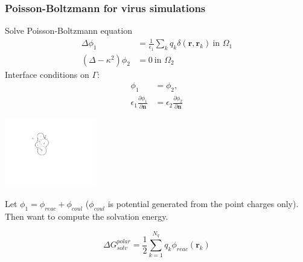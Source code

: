 \documentclass[dvipsnames,10pt]{beamer}
\begin{document}
\begin{frame}
	\frametitle{Poisson-Boltzmann for virus simulations}
	
	\vspace{.3cm}
	
	\begin{minipage}{5cm}
		Solve Poisson-Boltzmann equation
		\begin{align}
			\Delta\phi_1 &= \frac{1}{\epsilon_1}\sum_{k}q_k\delta(\mathbf{r}, \mathbf{r}_k)~\text{in }\Omega_1\nonumber\\
			(\Delta - \kappa^2)\phi_2 &= 0~\text{in }\Omega_2\nonumber
		\end{align}
		Interface conditions on $\Gamma$:
		\begin{align}
			\phi_1 &= \phi_2,\nonumber\\
			\epsilon_1\frac{\partial\phi_1}{\partial\mathbf{n}} &= \epsilon_2\frac{\partial\phi_2}{\partial \mathbf{n}}\nonumber
		\end{align}
		
	\end{minipage}
	\begin{minipage}{5cm}
		\includegraphics[width=4cm]{../figs/implicit_solvent.pdf}
	\end{minipage}
	Let $\phi_1 = \phi_{reac} + \phi_{coul}$ ($\phi_{coul}$ is potential generated from the point charges only). Then
	want to compute the solvation energy.
	\begin{tcolorbox}
		$$
		\Delta G_{solv}^{polar} = \frac{1}{2}\sum_{k=1}^{N_q}q_k\phi_{reac}(\mathbf{r}_k)
		$$
	\end{tcolorbox}
	
\end{frame}
\end{document}
